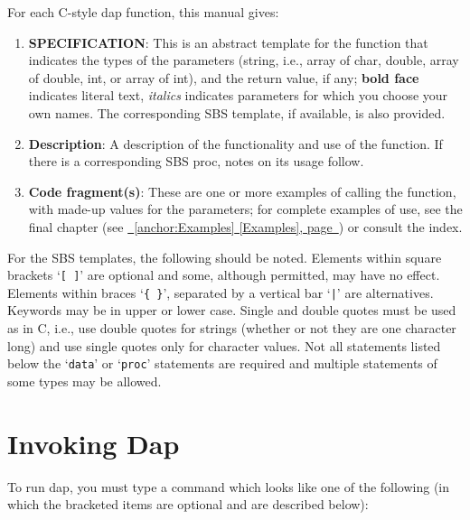 \documentclass{book}
\newcommand\Texinfocommandstyletextvar[1]{{\normalfont{}\textsl{#1}}}%
\renewcommand{\_}{\Texinfounderscore\discretionary{}{}{}}
\begin{document}
For each C-style dap function, this manual
%
%
gives:

\begin{enumerate}[start=1]
\item \textbf{SPECIFICATION}: This is an abstract template for the function that indicates the
types of the parameters (string,
%
%
%
i.e., array of char, double, array of double, int,
or array of int), and the return value, if any; \textbf{bold face} indicates
literal text, \Texinfocommandstyletextvar{italics} indicates parameters for which you choose your own
names. The corresponding SBS template, if available, is also provided.

\item \textbf{Description}: A description of the functionality and use of the function.
If there is a corresponding SBS proc, notes on its usage follow.

\item \textbf{Code fragment(s)}: These are one or more examples of calling the function, with made-up values
for the parameters; for complete examples of use, see the final chapter
(see \hyperref[anchor:Examples]{\chaptername~\ref*{anchor:Examples} [Examples], page~\pageref*{anchor:Examples}}) or consult the index.  
\end{enumerate}

%
For the SBS templates, the following should be noted.
Elements within square brackets `\texttt{[ ]}' are optional and
some, although permitted, may have no effect.
Elements within braces `\texttt{\{\ \}}', separated by a vertical bar `\texttt{|}' are
alternatives.
Keywords may be in upper or lower case.
Single and double quotes must be used as in C, i.e., use double quotes
for strings (whether or not they are one character long) and
use single quotes only for character values.
Not all statements listed below the `\texttt{data}' or `\texttt{proc}'
statements are required and multiple statements of some types may be allowed.

\section{{Invoking Dap}}
\label{anchor:Invoking-Dap}%
%
%

To run dap, you must type a command which looks like one of the following
(in which the bracketed items are optional and are described below):
\end{document}
